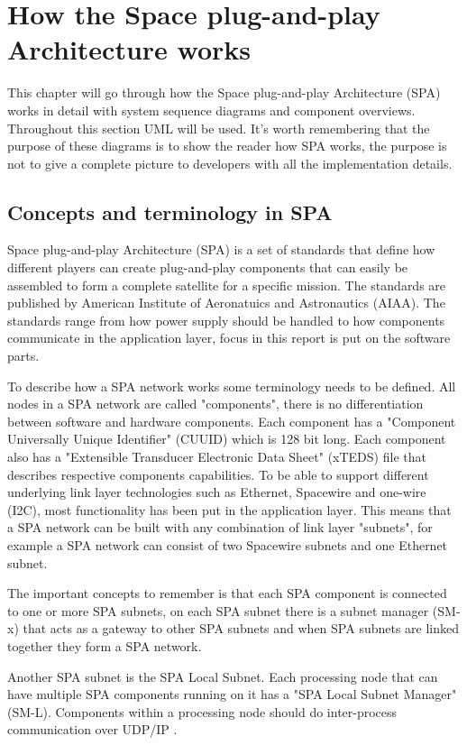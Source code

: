 \chapter{How the Space plug-and-play Architecture works}\label{ch:spa}
This chapter will go through how the Space plug-and-play Architecture (SPA)
works in detail with system sequence diagrams and component overviews.
Throughout this section UML will be used. It's worth remembering
that the purpose of these diagrams is to show the reader how SPA works, the
purpose is not to give a complete picture to developers with all the
implementation details.

\section{Concepts and terminology in SPA}
Space plug-and-play Architecture (SPA) is a set of standards that define how
different players can create plug-and-play components that can easily be
assembled to form a complete satellite for a specific mission. The standards
are published by American Institute of Aeronatuics and Astronautics (AIAA). The
standards range from how power supply should be handled to how components
communicate in the application layer, focus in this report is put on the
software parts.

To describe how a SPA network works some terminology needs to be defined. All
nodes in a SPA network are called "components", there is no differentiation
between software and hardware components. Each component has a "Component
Universally Unique Identifier" (CUUID) which is 128 bit long. Each component
also has a "Extensible Transducer Electronic Data Sheet" (xTEDS) file that
describes respective components capabilities. To be able to support different
underlying link layer technologies such as Ethernet, Spacewire and one-wire
(I2C), most functionality has been put in the application layer. This means
that a SPA network can be built with any combination of link layer "subnets",
for example a SPA network can consist of two Spacewire subnets and one Ethernet
subnet.

The important concepts to remember is that each SPA component is
connected to one or more SPA subnets, on each SPA subnet there is a subnet
manager (SM-x) that acts as a gateway to other SPA subnets and when SPA subnets
are linked together they form a SPA network.

Another SPA subnet is the SPA Local Subnet. Each processing node that can
have multiple SPA components running on it has a "SPA Local Subnet Manager"
(SM-L).  Components within a processing node should do inter-process
communication over UDP/IP \cite{spa:local-subnet}.

